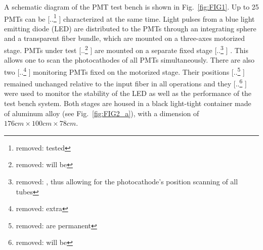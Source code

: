 \documentclass{nst}
\providecommand{\DIFadd}[1]{{\protect\color{blue} \sf #1}} %
\providecommand{\DIFdel}[1]{{\protect\color{red} [..\footnote{removed: #1} ]}} %
\providecommand{\DIFaddbegin}{} %
\providecommand{\DIFaddend}{} %
\providecommand{\DIFdelbegin}{} %
\providecommand{\DIFdelend}{} %
\begin{document}
A schematic diagram of the PMT test bench is shown in Fig.~\ref{fig:FIG1}.
Up to 25 PMTs can be \DIFdelbegin \DIFdel{tested }\DIFdelend \DIFaddbegin \DIFadd{characterized }\DIFaddend at the same time.
Light pulses from a blue light emitting diode (LED) are distributed to the PMTs through an integrating sphere and a transparent fiber bundle, which are mounted on a three-axes motorized stage.
PMTs under test \DIFdelbegin \DIFdel{will be }\DIFdelend \DIFaddbegin \DIFadd{are }\DIFaddend mounted on a separate fixed stage\DIFdelbegin \DIFdel{, thus allowing for the photocathode's position scanning of all tubes }\DIFdelend \DIFaddbegin \DIFadd{. This allows one to scan the photocathodes of all PMTs }\DIFaddend simultaneously.
There are also two \DIFdelbegin \DIFdel{extra }\DIFdelend \DIFaddbegin \DIFadd{monitoring }\DIFaddend PMTs fixed on the motorized stage.
Their positions \DIFdelbegin \DIFdel{are permanent }\DIFdelend \DIFaddbegin \DIFadd{remained unchanged }\DIFaddend relative to the input fiber in all operations and they \DIFdelbegin \DIFdel{will be }\DIFdelend \DIFaddbegin \DIFadd{were }\DIFaddend used to monitor the stability of the LED as well as the performance of the test bench system.
Both stages are housed in a black light-tight container made of aluminum alloy (see Fig.~\ref{fig:FIG2_a}), with a dimension of $176cm\times100cm\times78cm$.
\end{document}
